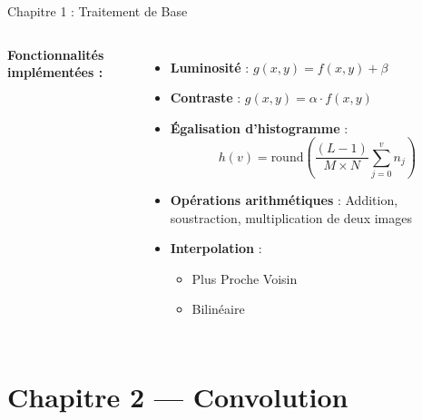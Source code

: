 \documentclass[aspectratio=169, 11pt]{beamer}
\begin{document}
\begin{frame}{Chapitre 1 : Traitement de Base}
  \begin{columns}[T]
    \textbf{\textcolor{uy1blue}{Fonctionnalités implémentées :}}
    \begin{itemize}
      \item \textbf{Luminosité} : $g(x,y) = f(x,y) + \beta$
      \item \textbf{Contraste} : $g(x,y) = \alpha \cdot f(x,y)$
      \item \textbf{Égalisation d'histogramme} :
        \[ h(v) = \text{round}\left(\frac{(L-1)}{M \times N} \sum_{j=0}^{v} n_j \right) \]
      \item \textbf{Opérations arithmétiques} : Addition, soustraction, multiplication de deux images
      \item \textbf{Interpolation} :
        \begin{itemize}
          \item Plus Proche Voisin
          \item Bilinéaire
        \end{itemize}
    \end{itemize}

  \end{columns}
\end{frame}

\section{Chapitre 2 — Convolution}
\end{document}
